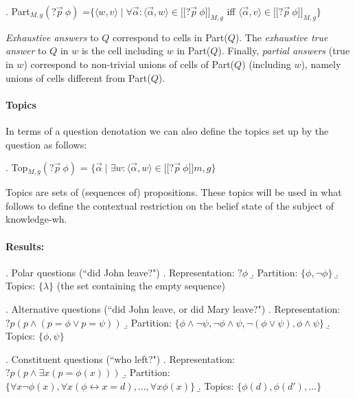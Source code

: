 \documentclass[a4paper, 11pt]{article}
\newcommand\notext[1]{}
\newcommand{\lin}{\ensuremath{\lbrack\!\lbrack}}
\newcommand{\rin}{\ensuremath{\rbrack\!\rbrack}}
\begin{document}
 

 

\ex. Part$_{M,g}(?\vec{p}  \ \phi)$ =$\{\langle  w,v\rangle \mid  \forall \vec{\alpha}:      \langle \vec{\alpha}, w \rangle \in  \lin?\vec{p} \ \phi\rin_{M,g} $ iff  $ \langle \vec{\alpha} , v \rangle \in  \lin ?\vec{p} \ \phi\rin_{M,g} \}$  

 \notext{ True exhaustive answer wrt $w$:

\ex. TEA$_w (?p_1,...,p_n  \phi)$=$\{ w'  \mid  \forall \alpha_1,...,\alpha_n:      \langle \alpha_1,...,\alpha_n, w \rangle \in  [?p_1,...,p_n  \phi] $ iff  $ \langle \alpha_1,...,\alpha_n, w' \rangle \in  [?p_1,...,p_n  \phi] \}$ }

\noindent \emph{Exhaustive answers} to $Q$ correspond to cells in
Part($Q$). The \emph{exhaustive true answer} to $Q$ in $w$ is the
cell including $w$ in Part($Q$). Finally, \emph{partial answers}
(true in $w$) correspond to non-trivial unions of cells of
Part($Q$) (including $w$), namely unions of cells different from
Part($Q$).


\paragraph{Topics} In terms of a question denotation we can also define the topics set up by the question as follows:

\ex. Top$_{M,g}(?\vec{p} \ \phi)$ = $\{  \vec{\alpha}  \mid \exists w:  
  \langle  \vec{\alpha} , w\rangle  \in \lin ?\vec{p}  \ \phi\rin{m,g}  \}$

Topics are sets of (sequences of) propositions. These topics will be used in what follows to define the contextual restriction on the belief state of the subject of   knowledge-wh.
\paragraph{Results:}

\ex. Polar questions (``did John leave?")
\a. Representation: $?\phi$
\b. Partition: $\{\phi, \neg \phi\}$
\b. Topics: $\{ \lambda\}$ (the set containing the empty sequence)


\ex. Alternative questions (``did John leave, or did Mary leave?")
\a. Representation: $?p ( p \wedge (p=\phi \vee p=\psi))$
\b. Partition: $\{\phi \wedge \neg \psi, \neg \phi \wedge   \psi, \neg (\phi\vee \psi), \phi \wedge \psi\}$
\b. Topics: $\{\phi,\psi\}$


\ex. Constituent questions (``who left?")
\a. Representation: $?p( p \wedge \exists x (p=\phi(x)))$
\b. Partition: $\{\forall x  \neg \phi(x), \forall x (\phi \leftrightarrow x=d), ..., \forall x \phi(x)\}$
\b. Topics: $\{\phi(d),\phi(d'), ...\}$
\end{document}
